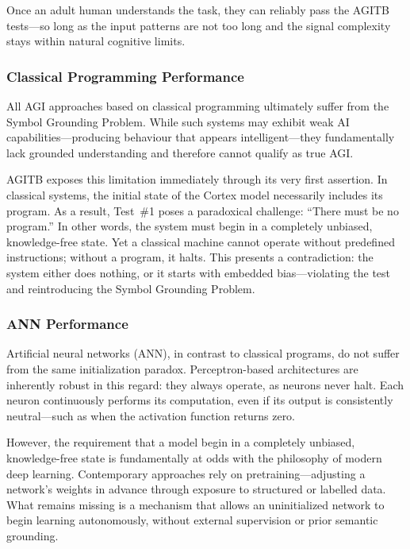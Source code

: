 \documentclass{article}
\begin{document}
Once an adult human understands the task, they can reliably pass the AGITB tests—so long as the input patterns are not too long and the signal complexity stays within natural cognitive limits.


\subsubsection{Classical Programming Performance}

All AGI approaches based on classical programming ultimately suffer from the Symbol Grounding Problem. While such systems may exhibit weak AI capabilities—producing behaviour that appears intelligent—they fundamentally lack grounded understanding and therefore cannot qualify as true AGI.

AGITB exposes this limitation immediately through its very first assertion. In classical systems, the initial state of the Cortex model necessarily includes its program. As a result, Test~\#1 poses a paradoxical challenge: “There must be no program.” In other words, the system must begin in a completely unbiased, knowledge-free state. Yet a classical machine cannot operate without predefined instructions; without a program, it halts. This presents a contradiction: the system either does nothing, or it starts with embedded bias—violating the test and reintroducing the Symbol Grounding Problem.


\subsubsection{ANN Performance}

Artificial neural networks (ANN), in contrast to classical programs, do not suffer from the same initialization paradox. Perceptron-based architectures are inherently robust in this regard: they always operate, as neurons never halt. Each neuron continuously performs its computation, even if its output is consistently neutral—such as when the activation function returns zero.

However, the requirement that a model begin in a completely unbiased, knowledge-free state is fundamentally at odds with the philosophy of modern deep learning. Contemporary approaches rely on pretraining—adjusting a network’s weights in advance through exposure to structured or labelled data. What remains missing is a mechanism that allows an uninitialized network to begin learning autonomously, without external supervision or prior semantic grounding.
\end{document}
